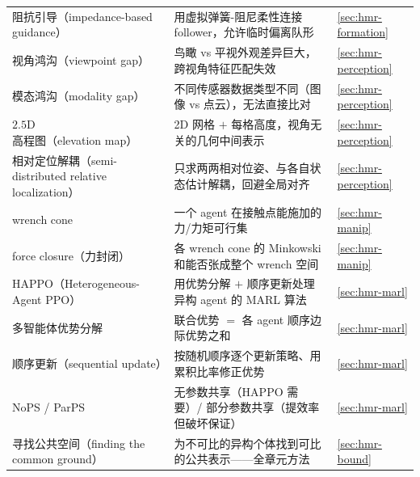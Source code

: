 \begin{table}[H]
\begin{tabular}{p{4.6cm}p{6.4cm}p{1.0cm}}
阻抗引导（impedance-based guidance） & 用虚拟弹簧-阻尼柔性连接 follower，允许临时偏离队形 & \cref{sec:hmr-formation} \\
视角鸿沟（viewpoint gap） & 鸟瞰 vs 平视外观差异巨大，跨视角特征匹配失效 & \cref{sec:hmr-perception} \\
模态鸿沟（modality gap） & 不同传感器数据类型不同（图像 vs 点云），无法直接比对 & \cref{sec:hmr-perception} \\
$2.5\mathrm{D}$ 高程图（elevation map） & 2D 网格 $+$ 每格高度，视角无关的几何中间表示 & \cref{sec:hmr-perception} \\
相对定位解耦（semi-distributed relative localization） & 只求两两相对位姿、与各自状态估计解耦，回避全局对齐 & \cref{sec:hmr-perception} \\
wrench cone & 一个 agent 在接触点能施加的力/力矩可行集 & \cref{sec:hmr-manip} \\
force closure（力封闭） & 各 wrench cone 的 Minkowski 和能否张成整个 wrench 空间 & \cref{sec:hmr-manip} \\
HAPPO（Heterogeneous-Agent PPO） & 用优势分解 $+$ 顺序更新处理异构 agent 的 MARL 算法 & \cref{sec:hmr-marl} \\
多智能体优势分解 & 联合优势 $=$ 各 agent 顺序边际优势之和 & \cref{sec:hmr-marl} \\
顺序更新（sequential update） & 按随机顺序逐个更新策略、用累积比率修正优势 & \cref{sec:hmr-marl} \\
NoPS / ParPS & 无参数共享（HAPPO 需要）/ 部分参数共享（提效率但破坏保证） & \cref{sec:hmr-marl} \\
寻找公共空间（finding the common ground） & 为不可比的异构个体找到可比的公共表示——全章元方法 & \cref{sec:hmr-bound} \\
\bottomrule
\end{tabular}
\end{table}

